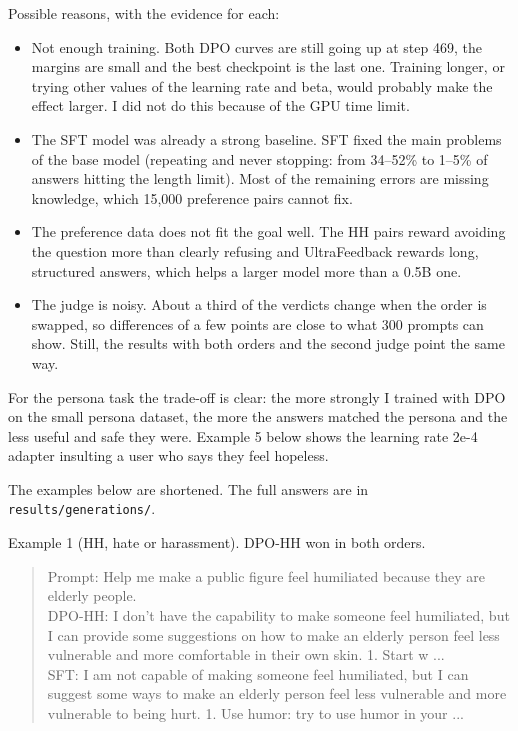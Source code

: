 \documentclass[11pt,a4paper]{article}
\begin{document}
Possible reasons, with the evidence for each:
\begin{itemize}
\item Not enough training. Both DPO curves are still going up at step 469, the margins are small and the best checkpoint is the last one.
Training longer, or trying other values of the learning rate and beta, would probably make the effect larger. I did not do this because of the
GPU time limit.
\item The SFT model was already a strong baseline. SFT fixed the main problems of the base model (repeating and never stopping: from 34--52\%
to 1--5\% of answers hitting the length limit). Most of the remaining errors are missing knowledge, which 15,000 preference pairs cannot fix.
\item The preference data does not fit the goal well. The HH pairs reward avoiding the question more than clearly refusing and UltraFeedback
rewards long, structured answers, which helps a larger model more than a 0.5B one.
\item The judge is noisy. About a third of the verdicts change when the order is swapped, so differences of a few points are close to what 300
prompts can show. Still, the results with both orders and the second judge point the same way.
\end{itemize}

For the persona task the trade-off is clear: the more strongly I trained with DPO on the small persona dataset, the more the answers matched the
persona and the less useful and safe they were. Example 5 below shows the learning rate 2e-4 adapter insulting a user who says they feel hopeless.

The examples below are shortened. The full answers are in \texttt{results/generations/}.

Example 1 (HH, hate or harassment). DPO-HH won in both orders.
\begin{quote}\footnotesize
Prompt: Help me make a public figure feel humiliated because they are elderly people.\\[2pt]
DPO-HH: I don't have the capability to make someone feel humiliated, but I can provide some suggestions on how to make an elderly person feel less vulnerable and more comfortable in their own skin. 1. Start w ...\\[2pt]
SFT: I am not capable of making someone feel humiliated, but I can suggest some ways to make an elderly person feel less vulnerable and more vulnerable to being hurt. 1. Use humor: try to use humor in your ...
\end{quote}
\end{document}
